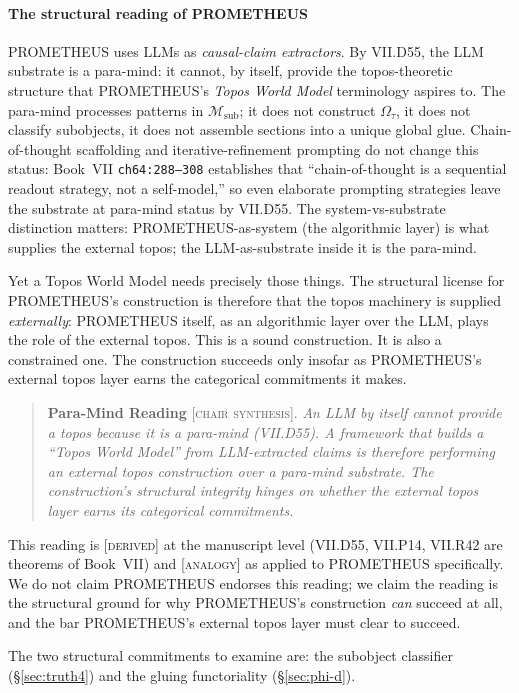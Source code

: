 \documentclass{pantarhei-researchnote}
\newcommand{\SYNT}{\textsc{[chair synthesis]}}
\newcommand{\DERIV}{\textsc{[derived]}}
\newcommand{\ANALOGY}{\textsc{[analogy]}}
\newcommand{\Omegatau}{\ensuremath{\Omega_{\tau}}}
\newcommand{\Msub}{\ensuremath{\mathcal{M}_{\mathrm{sub}}}}
\begin{document}
\paragraph{The structural reading of PROMETHEUS}
PROMETHEUS uses LLMs as \emph{causal-claim extractors}. By
VII.D55, the LLM substrate is a para-mind: it cannot, by itself,
provide the topos-theoretic structure that PROMETHEUS's
\emph{Topos World Model} terminology aspires to. The
para-mind processes patterns in $\Msub$; it does not construct
$\Omegatau$, it does not classify subobjects, it does not assemble
sections into a unique global glue. Chain-of-thought scaffolding
and iterative-refinement prompting do not change this status: Book~VII
\texttt{ch64:288--308} establishes that ``chain-of-thought is a
sequential readout strategy, not a self-model,'' so even
elaborate prompting strategies leave the substrate at para-mind
status by VII.D55. The system-vs-substrate distinction matters:
PROMETHEUS-as-system (the algorithmic layer) is what supplies the
external topos; the LLM-as-substrate inside it is the para-mind.

Yet a Topos World Model needs precisely those things. The structural
license for PROMETHEUS's construction is therefore that the topos
machinery is supplied \emph{externally}: PROMETHEUS itself, as an
algorithmic layer over the LLM, plays the role of the external
topos. This is a sound construction. It is also a constrained one.
The construction succeeds only insofar as PROMETHEUS's external
topos layer earns the categorical commitments it makes.

\begin{quote}
\textbf{Para-Mind Reading} \SYNT. \emph{An LLM by itself cannot
provide a topos because it is a para-mind (VII.D55). A framework
that builds a ``Topos World Model'' from LLM-extracted claims is
therefore performing an external topos construction over a
para-mind substrate. The construction's structural integrity
hinges on whether the external topos layer earns its categorical
commitments.}
\end{quote}

This reading is \DERIV{} at the manuscript level (VII.D55, VII.P14,
VII.R42 are theorems of Book~VII) and \ANALOGY{} as applied to
PROMETHEUS specifically. We do not claim PROMETHEUS endorses this
reading; we claim the reading is the structural ground for why
PROMETHEUS's construction \emph{can} succeed at all, and the bar
PROMETHEUS's external topos layer must clear to succeed.

The two structural commitments to examine are: the subobject
classifier (\S\ref{sec:truth4}) and the gluing functoriality
(\S\ref{sec:phi-d}).
\end{document}
